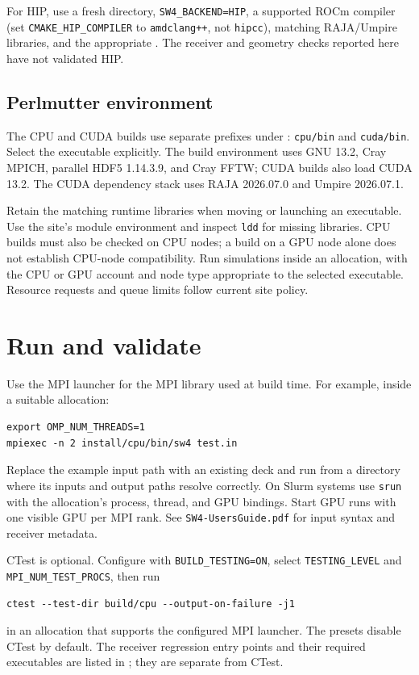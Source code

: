 \documentclass[11pt]{article}
\begin{document}
For HIP, use a fresh directory, \texttt{SW4\_BACKEND=HIP}, a supported ROCm
compiler (set \texttt{CMAKE\_HIP\_COMPILER} to \texttt{amdclang++}, not \texttt{hipcc}),
matching RAJA/Umpire libraries, and the appropriate
. The receiver and geometry checks reported
here have not validated HIP.

\subsection{Perlmutter environment}
The CPU and CUDA builds use separate prefixes under
:
\texttt{cpu/bin} and \texttt{cuda/bin}. Select the executable explicitly.
The build environment uses GNU 13.2, Cray MPICH, parallel HDF5 1.14.3.9,
and Cray FFTW; CUDA builds also load CUDA 13.2. The CUDA dependency stack
uses RAJA 2026.07.0 and Umpire 2026.07.1.

Retain the matching runtime libraries when moving or launching an executable.
Use the site's module environment and inspect \texttt{ldd} for missing
libraries. CPU builds must also be checked on CPU nodes; a build on a GPU
node alone does not establish CPU-node compatibility. Run simulations inside
an allocation, with the CPU or GPU account and node type appropriate to the
selected executable. Resource requests and queue limits follow current site
policy.

\section{Run and validate}
Use the MPI launcher for the MPI library used at build time. For example,
inside a suitable allocation:
\begin{samepage}
\begin{verbatim}
export OMP_NUM_THREADS=1
mpiexec -n 2 install/cpu/bin/sw4 test.in
\end{verbatim}
\end{samepage}
Replace the example input path with an existing deck and run from a directory
where its inputs and output paths resolve correctly. On Slurm systems use
\texttt{srun} with the allocation's process, thread, and GPU bindings.
Start GPU runs with one visible GPU per MPI rank. See
\texttt{SW4-UsersGuide.pdf} for input syntax and receiver metadata.

CTest is optional. Configure with \texttt{BUILD\_TESTING=ON}, select
\texttt{TESTING\_LEVEL} and \texttt{MPI\_NUM\_TEST\_PROCS}, then run
\begin{samepage}
\begin{verbatim}
ctest --test-dir build/cpu --output-on-failure -j1
\end{verbatim}
\end{samepage}
in an allocation
that supports the configured MPI launcher. The presets disable CTest by default.
The receiver regression entry points and their required executables are listed
in ; they are separate from CTest.
\end{document}
